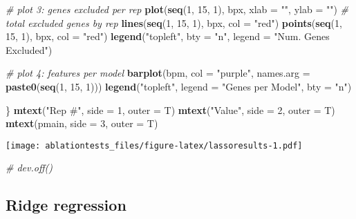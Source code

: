 \documentclass[]{article}
\newenvironment{Shaded}{\begin{snugshade}}{\end{snugshade}}
\newcommand{\CommentTok}[1]{\textcolor[rgb]{0.56,0.35,0.01}{\textit{#1}}}
\newcommand{\DataTypeTok}[1]{\textcolor[rgb]{0.13,0.29,0.53}{#1}}
\newcommand{\DecValTok}[1]{\textcolor[rgb]{0.00,0.00,0.81}{#1}}
\newcommand{\KeywordTok}[1]{\textcolor[rgb]{0.13,0.29,0.53}{\textbf{#1}}}
\newcommand{\NormalTok}[1]{#1}
\newcommand{\StringTok}[1]{\textcolor[rgb]{0.31,0.60,0.02}{#1}}
\begin{document}
\begin{Shaded}
\begin{Highlighting}[]
\CommentTok{# plot 3: genes excluded per rep}
\KeywordTok{plot}\NormalTok{(}\KeywordTok{seq}\NormalTok{(}\DecValTok{1}\NormalTok{, }\DecValTok{15}\NormalTok{, }\DecValTok{1}\NormalTok{), bpx, }\DataTypeTok{xlab =} \StringTok{""}\NormalTok{, }\DataTypeTok{ylab =} \StringTok{""}\NormalTok{) }\CommentTok{# total excluded genes by rep}
\KeywordTok{lines}\NormalTok{(}\KeywordTok{seq}\NormalTok{(}\DecValTok{1}\NormalTok{, }\DecValTok{15}\NormalTok{, }\DecValTok{1}\NormalTok{), bpx, }\DataTypeTok{col =} \StringTok{"red"}\NormalTok{)}
\KeywordTok{points}\NormalTok{(}\KeywordTok{seq}\NormalTok{(}\DecValTok{1}\NormalTok{, }\DecValTok{15}\NormalTok{, }\DecValTok{1}\NormalTok{), bpx, }\DataTypeTok{col =} \StringTok{"red"}\NormalTok{)}
\KeywordTok{legend}\NormalTok{(}\StringTok{"topleft"}\NormalTok{, }\DataTypeTok{bty =} \StringTok{"n"}\NormalTok{, }\DataTypeTok{legend =} \StringTok{"Num. Genes Excluded"}\NormalTok{)}

\CommentTok{# plot 4: features per model}
\KeywordTok{barplot}\NormalTok{(bpm, }\DataTypeTok{col =} \StringTok{"purple"}\NormalTok{, }\DataTypeTok{names.arg =} \KeywordTok{paste0}\NormalTok{(}\KeywordTok{seq}\NormalTok{(}\DecValTok{1}\NormalTok{, }\DecValTok{15}\NormalTok{, }\DecValTok{1}\NormalTok{)))}
\KeywordTok{legend}\NormalTok{(}\StringTok{"topleft"}\NormalTok{, }\DataTypeTok{legend =} \StringTok{"Genes per Model"}\NormalTok{, }\DataTypeTok{bty =} \StringTok{"n"}\NormalTok{)}

\NormalTok{\}}
\KeywordTok{mtext}\NormalTok{(}\StringTok{"Rep #"}\NormalTok{, }\DataTypeTok{side =} \DecValTok{1}\NormalTok{, }\DataTypeTok{outer =}\NormalTok{ T)}
\KeywordTok{mtext}\NormalTok{(}\StringTok{"Value"}\NormalTok{, }\DataTypeTok{side =} \DecValTok{2}\NormalTok{, }\DataTypeTok{outer =}\NormalTok{ T)}
\KeywordTok{mtext}\NormalTok{(pmain, }\DataTypeTok{side =} \DecValTok{3}\NormalTok{, }\DataTypeTok{outer =}\NormalTok{ T)}
\end{Highlighting}
\end{Shaded}

\texttt{[image: ablationtests\_files/figure-latex/lassoresults-1.pdf]}

\begin{Shaded}
\begin{Highlighting}[]
\CommentTok{# dev.off()}
\end{Highlighting}
\end{Shaded}

\hypertarget{ridge-regression}{%
\subsection{Ridge regression}\label{ridge-regression}}
\end{document}
